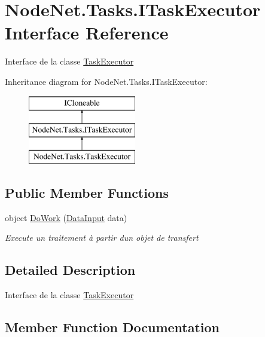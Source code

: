 \hypertarget{interface_node_net_1_1_tasks_1_1_i_task_executor}{}\section{Node\+Net.\+Tasks.\+I\+Task\+Executor Interface Reference}
\label{interface_node_net_1_1_tasks_1_1_i_task_executor}


Interface de la classe \hyperlink{class_node_net_1_1_tasks_1_1_task_executor}{Task\+Executor}  


Inheritance diagram for Node\+Net.\+Tasks.\+I\+Task\+Executor\+:\begin{figure}[H]
\begin{center}
\leavevmode
\includegraphics[height=3.000000cm]{interface_node_net_1_1_tasks_1_1_i_task_executor}
\end{center}
\end{figure}
\subsection*{Public Member Functions}
\begin{DoxyCompactItemize}
\item 
object \hyperlink{interface_node_net_1_1_tasks_1_1_i_task_executor_aa4abf3c0f5e8d8088be22e7977291f93}{Do\+Work} (\hyperlink{class_node_net_1_1_data_1_1_data_input}{Data\+Input} data)
\begin{DoxyCompactList}\small\item\em Execute un traitement à partir d\textquotesingle{}un objet de transfert \end{DoxyCompactList}\end{DoxyCompactItemize}


\subsection{Detailed Description}
Interface de la classe \hyperlink{class_node_net_1_1_tasks_1_1_task_executor}{Task\+Executor} 



\subsection{Member Function Documentation}
\mbox{\label{interface_node_net_1_1_tasks_1_1_i_task_executor_aa4abf3c0f5e8d8088be22e7977291f93}} 
